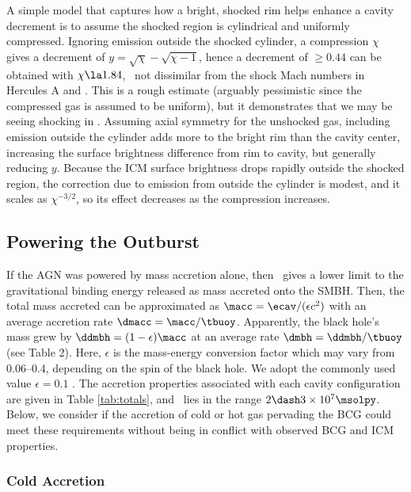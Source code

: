 \documentclass[11pt, preprint]{aastex}
\begin{document}
A simple model that captures how a bright, shocked rim helps enhance a
cavity decrement is to assume the shocked region is cylindrical and
uniformly compressed. Ignoring emission outside the shocked cylinder,
a compression $\chi$ gives a decrement of $y = \sqrt{\chi} -
\sqrt{\chi - 1}$, hence a decrement of $\ge 0.44$ can be obtained with
$\chi \la 1.84$, \ie\ not dissimilar from the shock Mach numbers in
Hercules A and \ms. This is a rough estimate (arguably pessimistic
since the compressed gas is assumed to be uniform), but it
demonstrates that we may be seeing shocking in \rbs. Assuming axial
symmetry for the unshocked gas, including emission outside the
cylinder adds more to the bright rim than the cavity center,
increasing the surface brightness difference from rim to cavity, but
generally reducing $y$. Because the ICM surface brightness drops
rapidly outside the shocked region, the correction due to emission
from outside the cylinder is modest, and it scales as $\chi^{-3/2}$,
so its effect decreases as the compression increases.

\subsection{Powering the Outburst}
\label{sec:accretion}

If the AGN was powered by mass accretion alone, then \ecav\ gives a
lower limit to the gravitational binding energy released as mass
accreted onto the SMBH. Then, the total mass accreted can be
approximated as $\macc = \ecav/(\epsilon c^2)$ with an average
accretion rate $\dmacc = \macc/\tbuoy$. Apparently, the black hole's
mass grew by $\ddmbh = (1-\epsilon)\macc$ at an average rate $\dmbh =
\ddmbh/\tbuoy$ (see Table 2). Here, $\epsilon$ is the mass-energy
conversion factor which may vary from 0.06--0.4, depending on the spin
of the black hole. We adopt the commonly used value $\epsilon = 0.1$
\citep{2002apa..book.....F}. The accretion properties associated with
each cavity configuration are given in Table \ref{tab:totals}, and
\macc\ lies in the range $2 \dash 3 \times 10^7 \msolpy$. Below, we
consider if the accretion of cold or hot gas pervading the BCG could
meet these requirements without being in conflict with observed BCG
and ICM properties.

\subsubsection{Cold Accretion}
\label{sec:cold}
\end{document}
